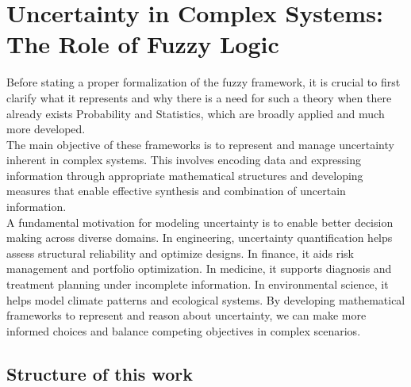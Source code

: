 \setcounter{chapter}{-1}
\chapter{Uncertainty in Complex Systems: The Role of Fuzzy Logic}


Before stating a proper formalization of the fuzzy framework, it is crucial to first clarify what it represents and why there is a need for such a theory when there already exists Probability and Statistics, which are broadly applied and much more developed.\\

The main objective of these frameworks is to represent and manage uncertainty inherent in complex systems. This involves encoding data and expressing information through appropriate mathematical structures and developing measures that enable effective synthesis and combination of uncertain information.\\

A fundamental motivation for modeling uncertainty is to enable better decision making across diverse domains. In engineering, uncertainty quantification helps assess structural reliability and optimize designs. In finance, it aids risk management and portfolio optimization. In medicine, it supports diagnosis and treatment planning under incomplete information. In environmental science, it helps model climate patterns and ecological systems. By developing mathematical frameworks to represent and reason about uncertainty, we can make more informed choices and balance competing objectives in complex scenarios.\\



 



\section{Structure of this work}






